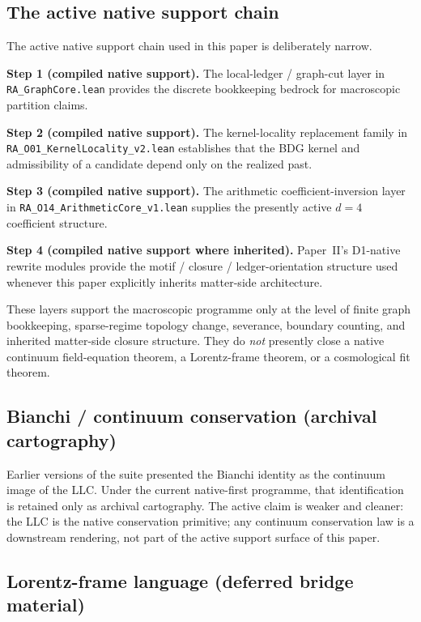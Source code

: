 \documentclass[11pt]{article}
\begin{document}
\subsection{The active native support chain}
\label{sec:gr_chain}

The active native support chain used in this paper is deliberately narrow.

\textbf{Step 1 (compiled native support).} The local-ledger / graph-cut layer in \texttt{RA\_GraphCore.lean} provides the discrete bookkeeping bedrock for macroscopic partition claims.

\textbf{Step 2 (compiled native support).} The kernel-locality replacement family in \texttt{RA\_O01\_KernelLocality\_v2.lean} establishes that the BDG kernel and admissibility of a candidate depend only on the realized past.

\textbf{Step 3 (compiled native support).} The arithmetic coefficient-inversion layer in \texttt{RA\_O14\_ArithmeticCore\_v1.lean} supplies the presently active $d=4$ coefficient structure.

\textbf{Step 4 (compiled native support where inherited).} Paper~II's D1-native rewrite modules provide the motif / closure / ledger-orientation structure used whenever this paper explicitly inherits matter-side architecture.

These layers support the macroscopic programme only at the level of finite graph bookkeeping, sparse-regime topology change, severance, boundary counting, and inherited matter-side closure structure. They do \emph{not} presently close a native continuum field-equation theorem, a Lorentz-frame theorem, or a cosmological fit theorem.

\subsection{Bianchi / continuum conservation (archival cartography)}
\label{sec:bianchi_is_llc}

Earlier versions of the suite presented the Bianchi identity as the continuum image of the LLC. Under the current native-first programme, that identification is retained only as archival cartography. The active claim is weaker and cleaner: the LLC is the native conservation primitive; any continuum conservation law is a downstream rendering, not part of the active support surface of this paper.

\subsection{Lorentz-frame language (deferred bridge material)}
\label{sec:lorentz_is_causal}
\end{document}
